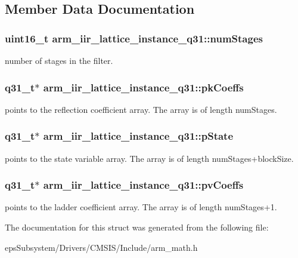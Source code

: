 \subsection{Member Data Documentation}
\hypertarget{structarm__iir__lattice__instance__q31_a9df4570ed28c50fd9193ab654ff236ad}{
\subsubsection[{num\-Stages}]{\setlength{\rightskip}{0pt plus 5cm}uint16\-\_\-t arm\-\_\-iir\-\_\-lattice\-\_\-instance\-\_\-q31\-::num\-Stages}}\label{structarm__iir__lattice__instance__q31_a9df4570ed28c50fd9193ab654ff236ad}
number of stages in the filter. \hypertarget{structarm__iir__lattice__instance__q31_a1d30aa16aac7722936ea9dee59211863}{
\subsubsection[{pk\-Coeffs}]{\setlength{\rightskip}{0pt plus 5cm}q31\-\_\-t$\ast$ arm\-\_\-iir\-\_\-lattice\-\_\-instance\-\_\-q31\-::pk\-Coeffs}}\label{structarm__iir__lattice__instance__q31_a1d30aa16aac7722936ea9dee59211863}
points to the reflection coefficient array. The array is of length num\-Stages. \hypertarget{structarm__iir__lattice__instance__q31_a941282745effd26a889fbfadf4b95e6a}{
\subsubsection[{p\-State}]{\setlength{\rightskip}{0pt plus 5cm}q31\-\_\-t$\ast$ arm\-\_\-iir\-\_\-lattice\-\_\-instance\-\_\-q31\-::p\-State}}\label{structarm__iir__lattice__instance__q31_a941282745effd26a889fbfadf4b95e6a}
points to the state variable array. The array is of length num\-Stages+block\-Size. \hypertarget{structarm__iir__lattice__instance__q31_a04507e2b982b1dfa97b7b55752dea6b9}{
\subsubsection[{pv\-Coeffs}]{\setlength{\rightskip}{0pt plus 5cm}q31\-\_\-t$\ast$ arm\-\_\-iir\-\_\-lattice\-\_\-instance\-\_\-q31\-::pv\-Coeffs}}\label{structarm__iir__lattice__instance__q31_a04507e2b982b1dfa97b7b55752dea6b9}
points to the ladder coefficient array. The array is of length num\-Stages+1. 

The documentation for this struct was generated from the following file\-:\begin{DoxyCompactItemize}
\item 
eps\-Subsystem/\-Drivers/\-C\-M\-S\-I\-S/\-Include/arm\-\_\-math.\-h\end{DoxyCompactItemize}
